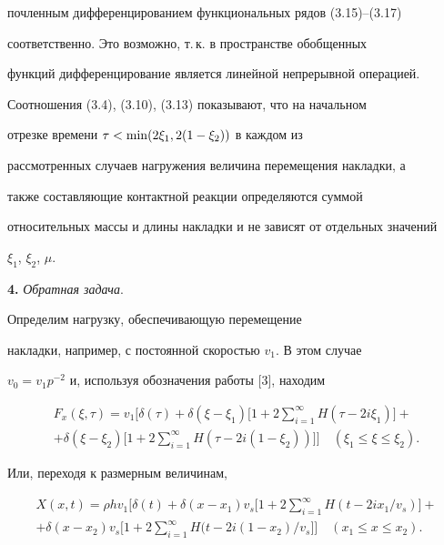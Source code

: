 почленным дифференцированием функциональных рядов (3.15)--(3.17)


соответственно. Это возможно, т.\,к. в пространстве обобщенных


функций дифференцирование является линейной непрерывной операцией.





Соотношения (3.4), (3.10), (3.13) показывают, что на начальном


отрезке времени $\tau < \min(2\xi_1,\linebreak 2(1-\xi_2))$ в каждом из


рассмотренных случаев нагружения величина перемещения накладки, а


также составляющие контактной реакции определяются суммой


относительных массы и длины накладки и не зависят от отдельных значений


$\xi_{1}$, $\xi_{2}$, $\mu$.


\medskip








{\bf 4.} {\it Обратная задача}.


Определим нагрузку, обеспечивающую перемещение


накладки, например, с постоянной скоростью $v_{1}$. В этом случае


$v_{0}=v_{1}p^{-2}$ и, используя обозначения работы [3], находим


\begin{multline}


F_{x}(\xi,\tau)=v_1\bigg[\delta(\tau)+\delta(\xi-\xi_1)\bigg[1+2


\sum_{i=1}^{\infty}H(\tau-2i\xi_1)\bigg]+\\


+\delta(\xi-\xi_2)\bigg[1+2\sum_{i=1}^{\infty}


H(\tau-2i(1-\xi_2))\bigg]\bigg] \quad (\xi_1\leq\xi\leq\xi_2).


\tag{4.1}


\end{multline}





Или, переходя к размерным величинам,


\begin{multline}


X(x,t)=\rho h v_1\bigg[\delta(t)+\delta(x-x_1)v_{s}\bigg[


1+2\sum_{i=1}^{\infty}H(t-2i x_1/v_{s})\bigg]+\\


+\delta(x-x_2)v_{s}\bigg[1+2\sum_{i=1}^{\infty}


H(t-2i (1-x_2)/v_{s}\bigg]\bigg] \quad (x_1\leq x\leq x_2).


\tag{4.2}


\end{multline}


